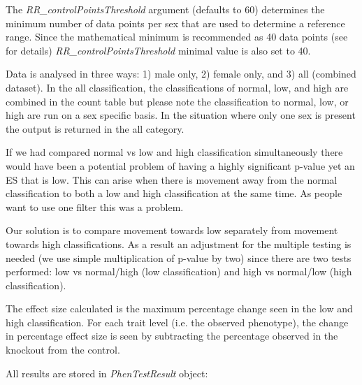 \documentclass[12pt,a4paper]{article}
\begin{document}
The \textit{RR\_controlPointsThreshold} argument (defaults to 60)  determines the minimum number of data points per sex that are used to determine a reference range.  Since the mathematical minimum is recommended as 40 data points (see \cite{Solberg} for details) \textit{RR\_controlPointsThreshold} minimal value is also set to 40.

Data is analysed in three ways: 1) male only, 2) female only, and 3)  all (combined dataset). In the all classification, the classifications of normal, low, and high are combined in the count table but please note the classification to normal, low, or high are run on a sex specific basis.  In the situation where only one sex is present the output is returned in the all category.

If we had compared normal vs low and high classification simultaneously there would have been a potential problem of having a highly significant p-value yet an ES that is low. This can arise when there is movement away from the normal classification to both a low and high classification at the same time. As people want to use one filter this was a problem. 

Our solution is to compare movement towards low separately from movement towards high classifications. As a result an adjustment for the multiple testing is needed (we use simple multiplication of p-value by two) since there are two tests performed: low vs normal/high (low classification) and high vs normal/low (high classification).  

The effect size calculated is the maximum percentage change seen in the low and high classification. For each trait level (i.e. the observed phenotype), the change in percentage effect size is seen by subtracting the percentage observed in the knockout from the control.

All results are stored in \textit{PhenTestResult} object:
\end{document}
